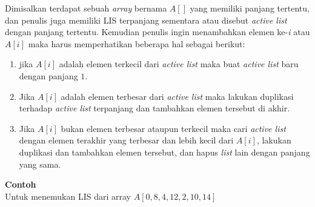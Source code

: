 \quad Dimisalkan terdapat sebuah \textit{array} bernama $A[]$ yang memiliki panjang tertentu, dan penulis juga memiliki LIS terpanjang sementara atau disebut \textit{active list} dengan panjang tertentu. Kemudian penulis ingin menambahkan elemen ke-\textit{i} atau $A[\textit{i}]$ maka harus memperhatikan beberapa hal sebagai berikut\cite{LIS}:
\begin{enumerate}
	\item jika $A[\textit{i}]$ adalah elemen terkecil dari \textit{active list} maka buat \textit{active list} baru dengan panjang $1$.
	\item Jika $A[\textit{i}]$ adalah elemen terbesar dari \textit{active list} maka lakukan duplikasi terhadap \textit{active list} terpanjang dan tambahkan elemen tersebut di akhir.
	\item Jika $A[\textit{i}]$ bukan elemen terbesar ataupun terkecil maka cari \textit{active list} dengan elemen terakhir yang terbesar dan lebih kecil dari $A[\textit{i}]$, lakukan duplikasi dan tambahkan elemen tersebut, dan hapus \textit{list} lain dengan panjang yang sama.
\end{enumerate}
\textbf{Contoh}\\
Untuk menemukan LIS dari array $A[0,8,4,12,2,10,14]$
